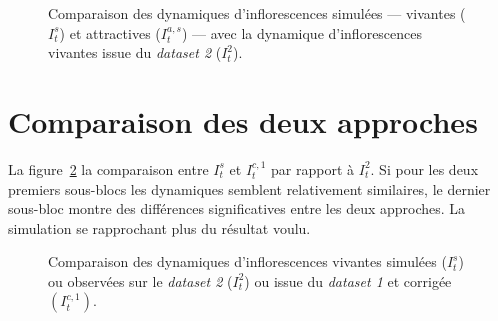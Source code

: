 \documentclass[a4paper, 11pt]{article}
\begin{document}
%  
% 

\begin{figure}[ht]
 \centering
 \caption{Comparaison des dynamiques d'inflorescences simulées --- vivantes ($I_t^s$) et attractives ($I_t^{a, s}$) --- avec la dynamique d'inflorescences vivantes issue du \textit{dataset 2} ($I_t^2$).}
 \label{simu}
\end{figure}



\section{Comparaison des deux approches}

La figure~\ref{comp} la comparaison entre $I_t^s$ et $I_t^{c, 1}$ par rapport à $I_t^2$. Si pour les deux premiers sous-blocs les dynamiques semblent relativement similaires, le dernier sous-bloc montre des différences significatives entre les deux approches. La simulation se rapprochant plus du résultat voulu.

%  
% 

\begin{figure}[ht]
 \centering
 \caption{Comparaison des dynamiques d'inflorescences vivantes simulées ($I_t^s$) ou observées sur le \textit{dataset 2} ($I_t^2$) ou issue du \textit{dataset 1} et corrigée $(I_t^{c,1})$.}
 \label{comp}
\end{figure}
\end{document}

